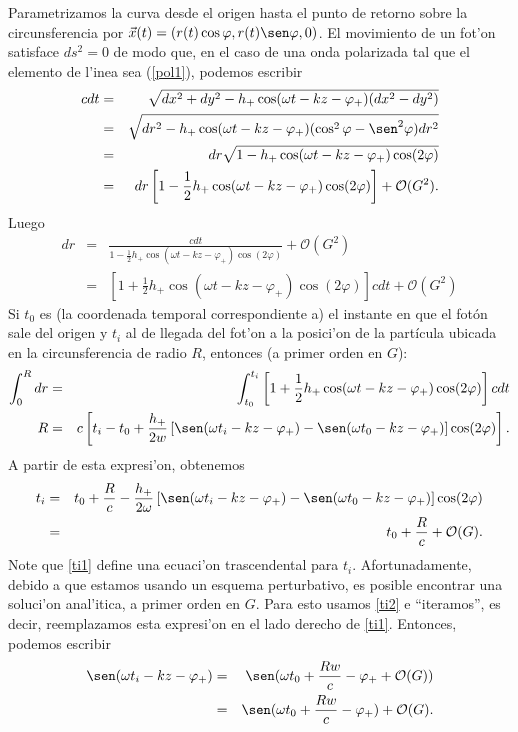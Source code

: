 Parametrizamos la curva desde el origen hasta el punto de retorno sobre la circunsferencia por $\vec{x}(t)=(r(t)\cos\varphi,r(t)\sen\varphi,0)$. El movimiento de un fot'on satisface $ds^2=0$ de modo que, en el caso de una onda polarizada tal que el elemento de l'inea sea (\ref{pol1}), podemos escribir
 \begin{eqnarray}
 cdt&=&\sqrt{dx^2+dy^2-h_+\cos(\omega t-kz-\varphi_+)(dx^2-dy^2)}\\
 &=&\sqrt{dr^2-h_+\cos(\omega t-kz-\varphi_+)(\cos^2\varphi-\sen^2\varphi)dr^2}\\
 &=&dr\sqrt{1-h_+\cos(\omega t-kz-\varphi_+)\cos(2\varphi)}\\
 &=&dr\left[1-\frac{1}{2}h_+\cos(\omega t-kz-\varphi_+)\cos(2\varphi)\right]+\mathcal{O}(G^2). \label{dr}
 \end{eqnarray}
Luego
\begin{eqnarray}
dr&=&\frac{cdt}{1-\frac{1}{2}h_+\cos(\omega t-kz-\varphi_+)\cos(2\varphi)}+\mathcal{O}(G^2)\\
&=&\left[1+\frac{1}{2}h_+\cos(\omega t-kz-\varphi_+)\cos(2\varphi) \right]cdt+\mathcal{O}(G^2)
\end{eqnarray}
Si $t_0$ es (la coordenada temporal correspondiente a) el instante en que el fot\'on sale del origen y $t_{i}$ al de llegada del fot'on a la posici'on de la part\'icula ubicada en la circunsferencia de radio $R$, entonces (a primer orden en $G$):
\begin{eqnarray}
\int_{0}^{R}dr&=&\int_{t_0}^{t_{i}}\left[1+\frac{1}{2}h_+\cos(\omega t-kz-\varphi_+)\cos(2\varphi) \right]cdt\\
R&=&c\left[t_{i}-t_{0}+\frac{h_+}{2w}\left[\sen(\omega t_i-kz-\varphi_+)-\sen(\omega t_0-kz-\varphi_+)\right]\cos(2\varphi) \right].
\end{eqnarray}
A partir de esta expresi'on, obtenemos
\begin{eqnarray}
t_i&=&t_0+\frac{R}{c}-\frac{h_+}{2\omega}\left[\sen(\omega t_i-kz-\varphi_+)-\sen(\omega t_0-kz-\varphi_+)\right]\cos(2\varphi) \label{ti1}\\
&=&t_0+\frac{R}{c}+\mathcal{O}(G). \label{ti2}
\end{eqnarray}
Note que \eqref{ti1} define una ecuaci'on trascendental para $t_i$. Afortunadamente, debido a que estamos usando un esquema perturbativo, es posible encontrar una soluci'on anal'itica, a primer orden en $G$. Para esto usamos \eqref{ti2} e ``iteramos'', es decir, reemplazamos esta expresi'on en el lado derecho de \eqref{ti1}. Entonces, podemos escribir
\begin{eqnarray}
\sen(\omega t_i-kz-\varphi_+)&=&\sen(\omega t_0+\frac{Rw}{c}-\varphi_++\mathcal{O}(G))\\
&= &\sen(\omega t_0+\frac{Rw}{c}-\varphi_+)+\mathcal{O}(G) .
\end{eqnarray}
